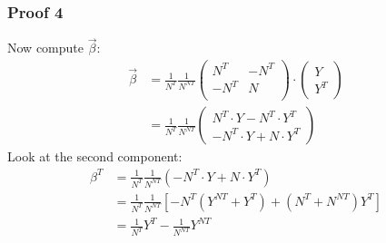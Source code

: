 \documentclass[mathserif, xcolor=table, svgnames]{beamer}
\begin{document}
\begin{frame}
  \frametitle{Proof 4}
  Now compute $\vec{\beta}$:
  \bigskip
  \begin{align*}
    \vec{\beta}
    &=
      \frac{1}{N^{T}} \frac{1}{N^{NT}}
      \begin{pmatrix}
        N^{T} & -N^{T} \\ -N^{T} & N\\
      \end{pmatrix}
    \cdot
      \begin{pmatrix}
        Y \\ Y^{T}
      \end{pmatrix}
    \\[2ex]
    &=
      \frac{1}{N^{T}} \frac{1}{N^{NT}}
      \begin{pmatrix}
        N^{T} \cdot Y - N^{T} \cdot Y^{T} \\
        -N^{T} \cdot Y + N \cdot Y^{T}
      \end{pmatrix}
  \end{align*}
  Look at the second component:
  \begin{align*}
    \beta^{T} 
    &=
      \frac{1}{N^{T}} \frac{1}{N^{NT}}
      \left(   -N^{T} \cdot Y + N \cdot Y^{T} \right)
    \\[2ex] 
    &= 
      \frac{1}{N^{T}} \frac{1}{N^{NT}}
      \left[
      -N^{T}\left( Y^{NT} + Y^{T} \right)
      +(N^{T} + N^{NT}) Y^{T} 
      \right]
    \\[2ex] 
    &= 
      \frac{1}{N^{T}} Y^{T} - \frac{1}{N^{NT}} Y^{NT}
  \end{align*}
\end{frame}
\end{document}

